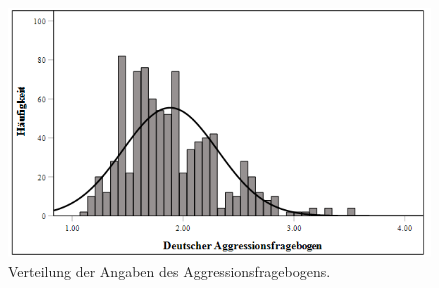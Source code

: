 \begin{figure}[htb!]
    \centering
        \includegraphics[width=0.8\linewidth]{Histogramm - AggroFB.png}
        \caption[Histogramm Aggressionsfragebogen]{Verteilung der Angaben des Aggressionsfragebogens.}
        \label{Histogramm AggroFB}
\end{figure}

